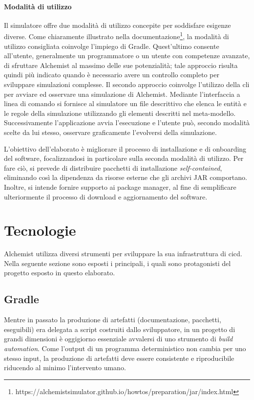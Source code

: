 \paragraph{Modalità di utilizzo} Il simulatore offre due modalità di utilizzo concepite per soddisfare esigenze diverse. 
Come chiaramente illustrato nella documentazione\footnote{https://alchemistsimulator.github.io/howtos/preparation/jar/index.html}, la modalità di utilizzo consigliata coinvolge l'impiego di Gradle. Quest'ultimo consente all'utente, generalmente un programmatore o un utente con competenze avanzate, di sfruttare Alchemist al massimo delle sue potenzialità; tale approccio risulta quindi più indicato quando è necessario avere un controllo completo per sviluppare simulazioni complesse. Il secondo approccio coinvolge l'utilizzo della \ac{cli} per avviare ed osservare una simulazione di Alchemist. Mediante l'interfaccia a linea di comando si fornisce al simulatore un file descrittivo che elenca le entità e le regole della simulazione utilizzando gli elementi descritti nel meta-modello. Successivamente l'applicazione avvia l'esecuzione e l'utente può, secondo modalità scelte da lui stesso, osservare graficamente l'evolversi della simulazione.

L'obiettivo dell'elaborato è migliorare il processo di installazione e di onboarding del software, focalizzandosi in particolare sulla seconda modalità di utilizzo. Per fare ciò, si prevede di distribuire pacchetti di installazione \textit{self-contained}, eliminando così la dipendenza da risorse esterne che gli archivi JAR comportano. Inoltre, si intende fornire supporto ai package manager, al fine di semplificare ulteriormente il processo di download e aggiornamento del software.

\section{Tecnologie}\label{sec:technologies}

Alchemist utilizza diversi strumenti per sviluppare la sua infrastruttura di \ac{cicd}. Nella seguente sezione sono esposti i principali, i quali sono protagonisti del progetto esposto in questo elaborato.

\subsection{Gradle}

Mentre in passato la produzione di artefatti (documentazione, pacchetti, eseguibili) era delegata a script costruiti dallo sviluppatore, in un progetto di grandi dimensioni è oggigiorno essenziale avvalersi di uno strumento di \textit{build automation}. Come l'output di un programma deterministico non cambia per uno stesso input, la produzione di artefatti deve essere consistente e riproducibile riducendo al minimo l'intervento umano. 

